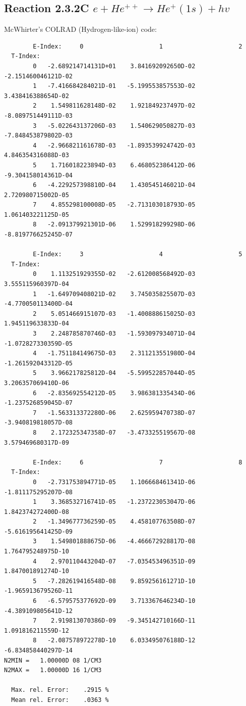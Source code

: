 \documentclass[12pt,dvipdfmx]{article}
\begin{document}
\subsection{
Reaction 2.3.2C   $e + He^{++} \rightarrow  He^+(1s) + hv$
}
McWhirter's COLRAD (Hydrogen-like-ion) code: \cite{kn:McWhirter}

\begin{small}\begin{verbatim}
        E-Index:     0                     1                     2
  T-Index:
        0   -2.689214714131D+01    3.841692092650D-02   -2.151460046121D-02
        1   -7.416684284021D-01   -5.199553857553D-02    3.438416388654D-02
        2    1.549811628148D-02    1.921849237497D-02   -8.089751449111D-03
        3   -5.022643137206D-03    1.540629050827D-03   -7.848453879802D-03
        4   -2.966821161678D-03   -1.893539924742D-03    4.846354316088D-03
        5    1.716018223894D-03    6.468052386412D-06   -9.304158014361D-04
        6   -4.229257398810D-04    1.430545146021D-04    2.720980715002D-05
        7    4.855298100008D-05   -2.713103018793D-05    1.061403221125D-05
        8   -2.091379921301D-06    1.529918299298D-06   -8.819776625245D-07

        E-Index:     3                     4                     5
  T-Index:
        0    1.113251929355D-02   -2.612008568492D-03    3.555115960397D-04
        1   -1.649709408021D-02    3.745035825507D-03   -4.770050113400D-04
        2    5.051466915107D-03   -1.400888615025D-03    1.945119633833D-04
        3    2.248785870746D-03   -1.593097934071D-04   -1.072827330359D-05
        4   -1.751184149675D-03    2.311213551980D-04   -1.261592043312D-05
        5    3.966217825812D-04   -5.599522857044D-05    3.206357069410D-06
        6   -2.835692554212D-05    3.986381335434D-06   -1.237526859045D-07
        7   -1.563313372280D-06    2.625959470738D-07   -3.940819818057D-08
        8    2.172325347358D-07   -3.473325519567D-08    3.579469680317D-09

        E-Index:     6                     7                     8
  T-Index:
        0   -2.731753894771D-05    1.106668461341D-06   -1.811175295207D-08
        1    3.368532716741D-05   -1.237223053047D-06    1.842374272400D-08
        2   -1.349677736259D-05    4.458107763508D-07   -5.616195641425D-09
        3    1.549801888675D-06   -4.466672928817D-08    1.764795248975D-10
        4    2.970110443204D-07   -7.035453496351D-09    1.847001891274D-10
        5   -7.282619416548D-08    9.859256161271D-10   -1.965913679526D-11
        6   -6.579575377692D-09    3.713367646234D-10   -4.389109805641D-12
        7    2.919813070386D-09   -9.345142710166D-11    1.091816211559D-12
        8   -2.087578972278D-10    6.033495076188D-12   -6.834858440297D-14
N2MIN =   1.00000D 08 1/CM3
N2MAX =   1.00000D 16 1/CM3

  Max. rel. Error:    .2915 %
  Mean rel. Error:    .0363 %


\end{verbatim}\end{small}
\end{document}
